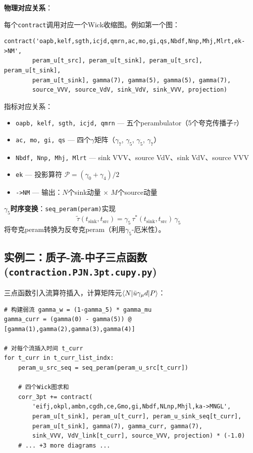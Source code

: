 \documentclass[11pt,a4paper]{ctexart}
\begin{document}
\textbf{物理对应关系}：

每个\texttt{contract}调用对应一个Wick收缩图。例如第一个图：
\begin{lstlisting}[style=einsum]
contract('oapb,kelf,sgth,icjd,qmrn,ac,mo,gi,qs,Nbdf,Nnp,Mhj,Mlrt,ek->NM',
        peram_u[t_src], peram_u[t_sink], peram_u[t_src], peram_u[t_sink],
        peram_u[t_sink], gamma(7), gamma(5), gamma(5), gamma(7),
        source_VVV, source_VdV, sink_VdV, sink_VVV, projection)
\end{lstlisting}

指标对应关系：
\begin{itemize}
\item \texttt{oapb, kelf, sgth, icjd, qmrn} — 五个perambulator（5个夸克传播子$\tau$）
\item \texttt{ac, mo, gi, qs} — 四个$\gamma$矩阵（$\gamma_7$, $\gamma_5$, $\gamma_5$, $\gamma_7$）
\item \texttt{Nbdf, Nnp, Mhj, Mlrt} — sink VVV、source VdV、sink VdV、source VVV
\item \texttt{ek} — 投影算符 $\mathcal{P} = (\gamma_0 + \gamma_4)/2$
\item \texttt{->NM} — 输出：$N$个sink动量 $\times$ $M$个source动量
\end{itemize}

\textbf{$\gamma_5$时序变换}：\texttt{seq\_peram(peram)}实现
\begin{equation}
\tilde{\tau}(t_{\mathrm{sink}}, t_{\mathrm{src}}) = \gamma_5 \, \tau^*(t_{\mathrm{sink}}, t_{\mathrm{src}}) \, \gamma_5
\end{equation}
将夸克peram转换为反夸克peram（利用$\gamma_5$-厄米性）。

\subsection{实例二：质子-流-中子三点函数 (\texttt{contraction.PJN.3pt.cupy.py})}

三点函数引入流算符插入，计算矩阵元$\braket{N|\bar{u}\gamma_\mu d|P}$：

\begin{codebox}[实例二关键差异]
\begin{lstlisting}[style=python]
# 构建弱流 gamma_w = (1-gamma_5) * gamma_mu
gamma_curr = (gamma(0) - gamma(5)) @ [gamma(1),gamma(2),gamma(3),gamma(4)]

# 对每个流插入时间 t_curr
for t_curr in t_curr_list_indx:
    peram_u_src_seq = seq_peram(peram_u_src[t_curr])

    # 四个Wick图求和
    corr_3pt += contract(
        'eifj,okpl,ambn,cgdh,ce,Gmo,gi,Nbdf,NLnp,Mhjl,ka->MNGL',
        peram_u[t_sink], peram_u[t_curr], peram_u_sink_seq[t_curr],
        peram_u[t_sink], gamma(7), gamma_curr, gamma(7),
        sink_VVV, VdV_link[t_curr], source_VVV, projection) * (-1.0)
    # ... +3 more diagrams ...
\end{lstlisting}
\end{codebox}
\end{document}
